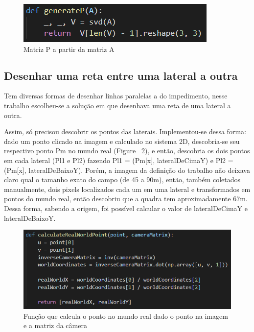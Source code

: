 \documentclass{article}
\begin{document}
        \begin{figure}[h!]
        \includegraphics[scale=1]{matrizP.PNG}
        \caption{Matriz P a partir da matriz A}
        \label{fig:matrizP}
        \end{figure}
        
    \subsection{Desenhar uma reta entre uma lateral a outra}
    Tem diversas formas de desenhar linhas paralelas a do impedimento, nesse trabalho escolheu-se a solução em que desenhava uma reta de uma lateral a outra. 
    
    Assim, só precisou descobrir os pontos das laterais. Implementou-se dessa forma: dado um ponto clicado na imagem e calculado no sistema 2D, descobria-se seu respectivo ponto Pm no mundo real (Figure ~\ref{fig:calculateRealWorldPoint}), e então, descobria os dois pontos em cada lateral (Pl1 e Pl2) fazendo Pl1 = (Pm[x], lateralDeCimaY) e Pl2 = (Pm[x], lateralDeBaixoY). Porém, a imagem da definição do trabalho não deixava claro qual o tamanho exato do campo (de 45 a 90m), então, também coletados manualmente, dois pixels localizados cada um em uma lateral e transformados em pontos do mundo real, então descobriu que a quadra tem aproximadamente 67m. Dessa forma, sabendo a origem, foi possível calcular o valor de lateralDeCimaY e lateralDeBaixoY.
    
        \begin{figure}[h!]
        \includegraphics[scale=0.9]{calculateRealWorldPoint.PNG}
        \caption{Função que calcula o ponto no mundo real dado o ponto na imagem e a matriz da câmera}
        \label{fig:calculateRealWorldPoint}
        \end{figure}
        
\end{document}
